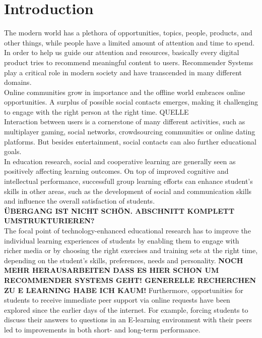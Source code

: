 \documentclass[nochapterpage,bigchapter,linedtoc,longdoc,colorback,accentcolor=tud3b]{tudreport}
\begin{document}
\chapter{Introduction}
The modern world has a plethora of opportunities, topics, people, products, and other things, while people have a limited amount of attention and time to spend. In order to help us guide our attention and resources, basically every digital product tries to recommend meaningful content to users. Recommender Systems play a critical role in modern society and have transcended in many different domains.\\
Online communities grow in importance and the offline world embraces online opportunities. A surplus of possible social contacts emerges, making it challenging to engage with the right person at the right time. QUELLE\\
Interaction between users is a cornerstone of many different activities, such as multiplayer gaming, social networks, crowdsourcing communities or online dating platforms. But besides entertainment, social contacts can also further educational goals.\\
In education research, social and cooperative learning are generally seen as positively affecting learning outcomes. \cite{bossert1982instructional, blumenfeld1996learning} On top of improved cognitive and intellectual performance, successfull group learning efforts can enhance student's skills in other areas, such as the development of social and communication skills and influence the overall satisfaction of students. \cite{zhao2004adding, maxwell2008learning}\\
\textbf{ÜBERGANG IST NICHT SCHÖN. ABSCHNITT KOMPLETT UMSTRUKTURIEREN?}\\
The focal point of technology-enhanced educational research has to improve the individual learning experiences of students by enabling them to engage with richer media or by choosing the right exercises and training sets at the right time, depending on the student's skills, preferences, needs and personality. \cite{drachsler2015panorama, erdt2015evaluating} \textbf{NOCH MEHR HERAUSARBEITEN DASS ES HIER SCHON UM RECOMMENDER SYSTEMS GEHT! GENERELLE RECHERCHEN ZU E LEARNING HABE ICH KAUM!} Furthermore, opportunities for students to receive immediate peer support via online requests have been explored since the earlier days of the internet. \cite{greer1998intelligent} For example, forcing students to discuss their answers to questions in an E-learning environment with their peers led to improvements in both short- and long-term performance. \cite{reidsema2016exploring}\\
\end{document}
